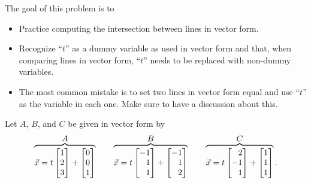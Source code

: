	\bookonlynewpage
	\question
	\begin{annotation}
		\begin{goals}

			The goal of this problem is to
			\begin{itemize}
				\item Practice computing the intersection between lines
					in vector form.
				\item Recognize ``$t$'' as a dummy variable as used
					in vector form and that, when comparing lines in
					vector form, ``$t$'' needs to be replaced with
					non-dummy variables.
			\end{itemize}
		\end{goals}

		\begin{notes}
			\begin{itemize}
				\item The most common mistake is to set two lines
					in vector form equal and use ``$t$'' as
					the variable in each one. Make sure to have a discussion
					about this.
			\end{itemize}
		\end{notes}
	\end{annotation}
	Let $A$, $B$, and $C$ be given in vector form by
	\[
	\overbrace{\vec x=t\mat{1\\2\\3}+\mat{0\\0\\1}}^{\displaystyle A}
	\qquad \overbrace{\vec x=t\mat{-1\\1\\1}+\mat{-1\\1\\2}}^{\displaystyle B}
	\qquad \overbrace{\vec x=t\mat{2\\-1\\1}+\mat{1\\1\\1}}^{\displaystyle C}.
	\]
